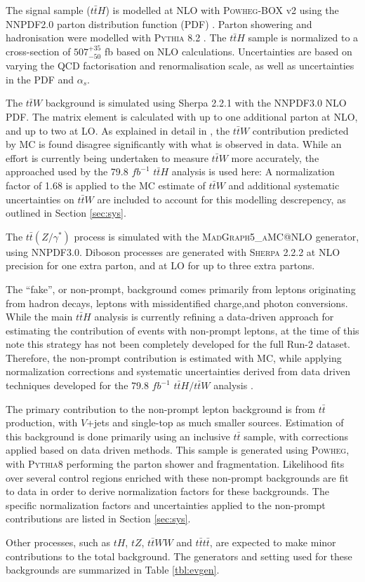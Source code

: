 The signal sample ($t\bar{t}H$) is modelled at NLO with \textsc{Powheg-BOX} v2 using the NNPDF2.0 parton distribution function (PDF) \cite{ATL-PHYS-PUB-2015-011}. Parton showering and hadronisation were modelled with \textsc{Pythia} 8.2 \cite{ATL-PHYS-PUB-2011-009}. The $t\bar{t}H$ sample is normalized to a cross-section of $507^{+35}_{-50}$ fb based on NLO calculations. Uncertainties are based on varying the QCD factorisation and renormalisation scale, as well as uncertainties in the PDF and $\alpha_s$.

The $t\bar{t}W$ background is simulated using Sherpa 2.2.1 with the NNPDF3.0 NLO PDF. The matrix element is calculated with up to one additional parton at NLO, and up to two at LO. As explained in detail in \cite{ttH_paper}, the $t\bar{t}W$ contribution predicted by MC is found disagree significantly with what is observed in data. While an effort is currently being undertaken to measure $t\bar{t}W$ more accurately, the approached used by the 79.8 $fb^{-1}$ $t\bar{t}H$ analysis is used here: A normalization factor of 1.68 is applied to the MC estimate of $t\bar{t}W$ and additional systematic uncertainties on $t\bar{t}W$ are included to account for this modelling descrepency, as outlined in Section \ref{sec:sys}.

The $t\bar{t}(Z/\gamma^*)$ process is simulated with the \textsc{MadGraph5\_aMC@NLO} generator, using NNPDF3.0. Diboson processes are generated with \textsc{Sherpa} 2.2.2 at NLO precision for one extra parton, and at LO for up to three extra partons.

The ``fake'', or non-prompt, background comes primarily from leptons originating from hadron decays, leptons with missidentified charge,and photon conversions. While the main $t\bar{t}H$ analysis is currently refining a data-driven approach for estimating the contribution of events with non-prompt leptons, at the time of this note this strategy has not been completely developed for the full Run-2 dataset. Therefore, the non-prompt contribution is estimated with MC, while applying normalization corrections and systematic uncertainties derived from data driven techniques developed for the 79.8 $fb^{-1}$ $t\bar{t}H/t\bar{t}W$ analysis \cite{ttH_paper}. 

The primary contribution to the non-prompt lepton background is from $t\bar{t}$ production, with $V$+jets and single-top as much smaller sources. Estimation of this background is done primarily using an inclusive $t\bar{t}$ sample, with corrections applied based on data driven methods. This sample is generated using \textsc{Powheg}, with \textsc{Pythia8} performing the parton shower and fragmentation. Likelihood fits over several control regions enriched with these non-prompt backgrounds are fit to data in order to derive normalization factors for these backgrounds. The specific normalization factors and uncertainties applied to the non-prompt contributions are listed in Section \ref{sec:sys}.

Other processes, such as $tH$, $tZ$, $t\bar{t}WW$ and $t\bar{t}t\bar{t}$, are expected to make minor contributions to the total background. The generators and setting used for these backgrounds are summarized in Table \ref{tbl:evgen}.

